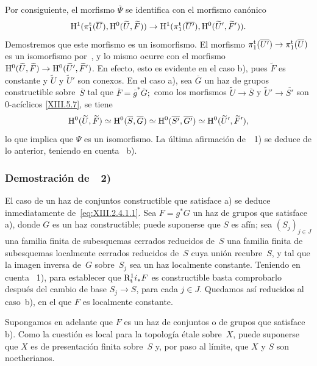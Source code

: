 Por consiguiente, el morfismo $\overline{\Psi}$ se identifica con el
morfismo canónico
$$
\mathrm H^1(\pi_1^{\mathrm{t}}(\overline{U}),\mathrm H^0(\widetilde{U},\widetilde{F}))
\to
\mathrm H^1(\pi_1^{\mathrm{t}}(\overline{U'}),\mathrm H^0(\widetilde{U}',\widetilde{F}')).
$$
Demostremos
que este morfismo es un isomorfismo. El morfismo
$\pi_1^{\mathrm{t}}(\overline{U'})\to\pi_1^{\mathrm{t}}(\overline{U})$
es un isomorfismo por~, y lo mismo ocurre con el morfismo
$\mathrm H^0(\widetilde{U},\widetilde{F})\to\allowbreak
\mathrm H^0(\widetilde{U}',\widetilde{F}')$. En efecto, esto es evidente en el
caso b), pues $\widetilde{F}$ es constante y $\widetilde{U}$ y
$\widetilde{U}'$ son conexos. En el caso a), sea $\overline{G}$ un haz
de grupos constructible sobre~$\overline{S}$ tal que
$\overline{F}=\overline{g}^*\overline{G};$ como los morfismos
$\widetilde{U}\to\overline{S}$ y
$\widetilde{U}'\to\overline{S'}$ son $0$-acíclicos
\eqref{XIII.5.7}, se tiene
$$
\mathrm H^0(\widetilde{U},\widetilde{F})\simeq
\mathrm H^0(\overline{S},\overline{G}) \simeq
\mathrm H^0(\overline{S'},\overline{G'})\simeq
\mathrm H^0(\widetilde{U}',\widetilde{F}'),
$$
lo que implica que $\Psi$ es un isomorfismo. La última afirmación
de~~1) se deduce de lo anterior, teniendo en cuenta
~b).

\subsubsection*{Demostración de~~\textup{2)}}

El caso de un haz de conjuntos constructible que satisface a) se deduce
inmediatamente de~\eqref{eq:XIII.2.4.1.1}. Sea $F=g^*G$ un haz de grupos
que satisface a), donde $G$ es un haz constructible; puede suponerse que
$S$ es afín; sea $(S_j)_{j\in J}$
{una familia finita de subesquemas cerrados reducidos de~$S$}
{una familia finita de subesquemas localmente cerrados reducidos de~$S$}
cuya unión recubre~$S$, y tal que la imagen inversa de~$G$ sobre~$S_j$
sea un haz localmente constante. Teniendo en cuenta
~1), para establecer que $\mathrm{R}^1_{\mathrm{t}}i_*F$ es
constructible basta comprobarlo después del cambio de base
$S_j\to S$, para cada $j\in J$. Quedamos así reducidos al caso~b),
en el que $F$ es localmente constante.

Supongamos en adelante que $F$ es un haz de conjuntos o de grupos que
satisface b). Como la cuestión es local para la topología étale sobre~$X$,
puede suponerse que $X$ es de presentación finita sobre~$S$ y, por paso
al límite, que $X$ y $S$ son noetherianos.

